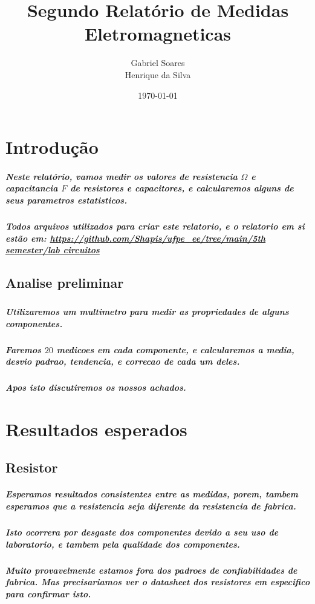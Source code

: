 \documentclass[12pt,twoside, a4paper, twocolumn]{article}
\title{Segundo Relatório de Medidas Eletromagneticas}
\author{Gabriel Soares \\ Henrique da Silva}
\date{\today}
\begin{document}
\maketitle
{}
\newpage
\tableofcontents
\newpage



\section{Introdução}


\subparagraph*{Neste relatório, vamos medir os valores de resistencia $\varOmega$ e capacitancia $F$ de resistores e capacitores, e calcularemos alguns de seus parametros estatisticos.}

\subparagraph*{Todos arquivos utilizados para criar este relatorio, e o relatorio em si estão em:  \url{https://github.com/Shapis/ufpe_ee/tree/main/5th semester/lab circuitos}}




\subsection{Analise preliminar}
\subparagraph*{}


\subparagraph*{Utilizaremos um multimetro para medir as propriedades de alguns componentes.}

\subparagraph*{Faremos $20$ medicoes em cada componente, e calcularemos a media, desvio padrao, tendencia, e correcao de cada um deles.}

\subparagraph*{Apos isto discutiremos os nossos achados.}

\section{Resultados esperados}

\subsection{Resistor}

\subparagraph*{Esperamos resultados consistentes entre as medidas, porem, tambem esperamos que a resistencia seja diferente da resistencia de fabrica.}

\subparagraph*{Isto ocorrera por desgaste dos componentes devido a seu uso de laboratorio, e tambem pela qualidade dos componentes.}

\subparagraph*{Muito provavelmente estamos fora dos padroes de confiabilidades de fabrica. Mas precisariamos ver o datasheet dos resistores em especifico para confirmar isto.}
\end{document}
